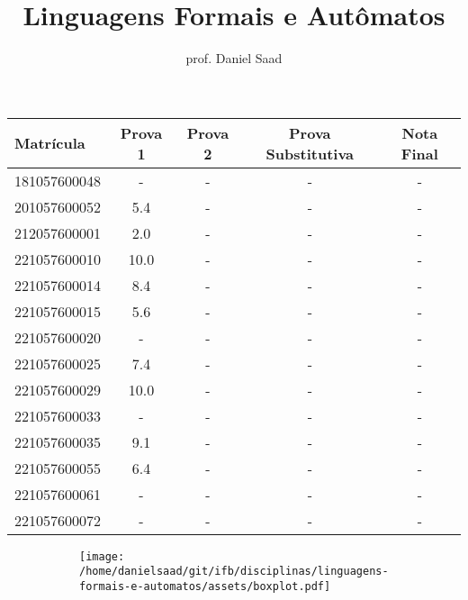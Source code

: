 \documentclass{article}
\title{ Linguagens Formais e Autômatos}
\date{}
\author{ prof. Daniel Saad}
\begin{document}
 \maketitle
    \begin{longtable}{|l|c|c|c|c|}
    \hline
Matrícula & Prova 1 & Prova 2 & Prova Substitutiva & Nota Final\\\hline \endhead   
181057600048 & - & - & - & -\\\hline
201057600052 & 5.4 & - & - & -\\\hline
212057600001 & 2.0 & - & - & -\\\hline
221057600010 & 10.0 & - & - & -\\\hline
221057600014 & 8.4 & - & - & -\\\hline
221057600015 & 5.6 & - & - & -\\\hline
221057600020 & - & - & - & -\\\hline
221057600025 & 7.4 & - & - & -\\\hline
221057600029 & 10.0 & - & - & -\\\hline
221057600033 & - & - & - & -\\\hline
221057600035 & 9.1 & - & - & -\\\hline
221057600055 & 6.4 & - & - & -\\\hline
221057600061 & - & - & - & -\\\hline
221057600072 & - & - & - & -\\\hline
\end{longtable}
\begin{figure}[h!]
\centering\begin{subfigure}
        \centering
        \texttt{[image: /home/danielsaad/git/ifb/disciplinas/linguagens-formais-e-automatos/assets/boxplot.pdf]}
    \end{subfigure}\end{figure}
\end{document}
